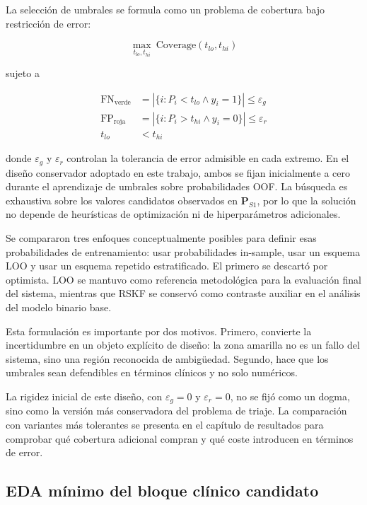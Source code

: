 La selección de umbrales se formula como un problema de cobertura bajo restricción de error:

\begin{equation}
\max_{t_{lo},t_{hi}} \ \mathrm{Coverage}(t_{lo},t_{hi})
\end{equation}

sujeto a

\begin{align}
\mathrm{FN}_{\text{verde}} &= |\{i : P_i < t_{lo} \land y_i = 1\}| \leq \varepsilon_g \\
\mathrm{FP}_{\text{roja}} &= |\{i : P_i > t_{hi} \land y_i = 0\}| \leq \varepsilon_r \\
t_{lo} &< t_{hi}
\end{align}

donde $\varepsilon_g$ y $\varepsilon_r$ controlan la tolerancia de error admisible en cada extremo. En el diseño conservador adoptado en este trabajo, ambos se fijan inicialmente a cero durante el aprendizaje de umbrales sobre probabilidades OOF. La búsqueda es exhaustiva sobre los valores candidatos observados en $\mathbf{P}_{S1}$, por lo que la solución no depende de heurísticas de optimización ni de hiperparámetros adicionales.

Se compararon tres enfoques conceptualmente posibles para definir esas probabilidades de entrenamiento: usar probabilidades
in-sample, usar un esquema LOO y usar un esquema repetido estratificado. El primero se descartó por optimista. LOO se
mantuvo como referencia metodológica para la evaluación final del sistema, mientras que RSKF se conservó como contraste
auxiliar en el análisis del modelo binario base.

Esta formulación es importante por dos motivos. Primero, convierte la incertidumbre en un objeto explícito de diseño: la zona amarilla no es un fallo del sistema, sino una región reconocida de ambigüedad. Segundo, hace que los umbrales sean defendibles en términos clínicos y no solo numéricos.

La rigidez inicial de este diseño, con $\varepsilon_g=0$ y $\varepsilon_r=0$, no se fijó como un dogma, sino como la
versión más conservadora del problema de triaje. La comparación con variantes más tolerantes se presenta en el capítulo
de resultados para comprobar qué cobertura adicional compran y qué coste introducen en términos de error.

\subsection{EDA mínimo del bloque clínico candidato}

